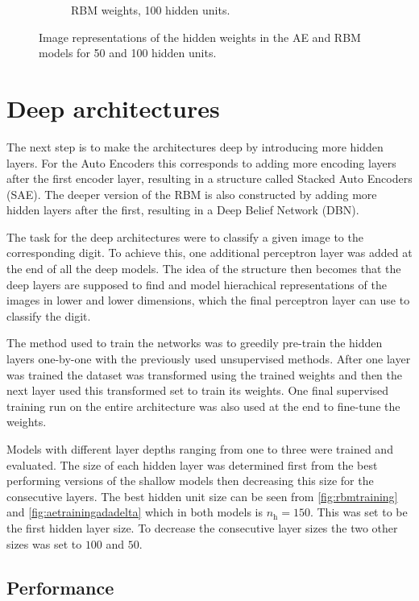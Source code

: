 \documentclass{article}
\begin{document}
\begin{figure}[!ht]
\begin{subfigure}[t]{0.47\textwidth}
    \caption{RBM weights, 100 hidden units.}
    \label{fig:w100rbm}
  \end{subfigure}
  \caption{
    Image representations of the hidden weights in the AE and RBM models
    for 50 and 100 hidden units.
  }
  \label{fig:hiddenweights}
\end{figure}

\section{Deep architectures}
The next step is to make the architectures deep by introducing more hidden layers.
For the Auto Encoders this corresponds to adding more encoding layers after the first encoder layer,
resulting in a structure called Stacked Auto Encoders (SAE).
The deeper version of the RBM is also constructed by adding more hidden layers after the first,
resulting in a Deep Belief Network (DBN).

The task for the deep architectures were to classify a given image to the corresponding digit.
To achieve this, one additional perceptron layer was added at the end of all the deep models.
The idea of the structure then becomes that the deep layers are supposed to find and model
hierachical representations of the images in lower and lower dimensions,
which the final perceptron layer can use to classify the digit.

The method used to train the networks was to greedily pre-train the hidden layers one-by-one
with the previously used unsupervised methods.
After one layer was trained the dataset was transformed using the trained weights
and then the next layer used this transformed set to train its weights.
One final supervised training run on the entire architecture
was also used at the end to fine-tune the weights.

Models with different layer depths ranging from one to three were trained and evaluated.
The size of each hidden layer was determined first from the best performing versions 
of the shallow models then decreasing this size for the consecutive layers.
The best hidden unit size can be seen from  \cref{fig:rbmtraining} and \cref{fig:aetrainingadadelta}
which in both models is $n_{\text{h}} = 150$.
This was set to be the first hidden layer size.
To decrease the consecutive layer sizes the two other sizes was set to $100$ and $50$.

\subsection{Performance}
\end{document}
